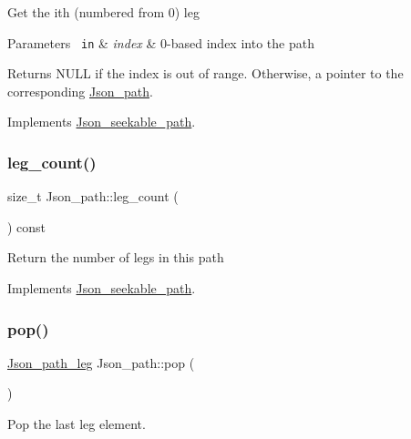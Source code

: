Get the ith (numbered from 0) leg


\begin{DoxyParams}[1]{Parameters}
\mbox{\texttt{ in}}  & {\em index} & 0-\/based index into the path\\
\hline
\end{DoxyParams}
\begin{DoxyReturn}{Returns}
N\+U\+LL if the index is out of range. Otherwise, a pointer to the corresponding \mbox{\hyperlink{classJson__path}{Json\+\_\+path}}. 
\end{DoxyReturn}


Implements \mbox{\hyperlink{classJson__seekable__path_a590e675762b99402555d555fb99ffa4f}{Json\+\_\+seekable\+\_\+path}}.

\mbox{\label{classJson__path_a22b4d53c90300f917ab7abaedad8bfaa}} 
\subsubsection{\texorpdfstring{leg\+\_\+count()}{leg\_count()}}
{\footnotesize\ttfamily size\+\_\+t Json\+\_\+path\+::leg\+\_\+count (\begin{DoxyParamCaption}{ }\end{DoxyParamCaption}) const\hspace{0.3cm}{\ttfamily [virtual]}}

Return the number of legs in this path 

Implements \mbox{\hyperlink{classJson__seekable__path_aa268c1af2eec01b70924509a23b8db59}{Json\+\_\+seekable\+\_\+path}}.

\mbox{\label{classJson__path_aaa77ca94d28474ce3614aa692bd1edbe}} 
\subsubsection{\texorpdfstring{pop()}{pop()}}
{\footnotesize\ttfamily \mbox{\hyperlink{classJson__path__leg}{Json\+\_\+path\+\_\+leg}} Json\+\_\+path\+::pop (\begin{DoxyParamCaption}{ }\end{DoxyParamCaption})}

Pop the last leg element.

